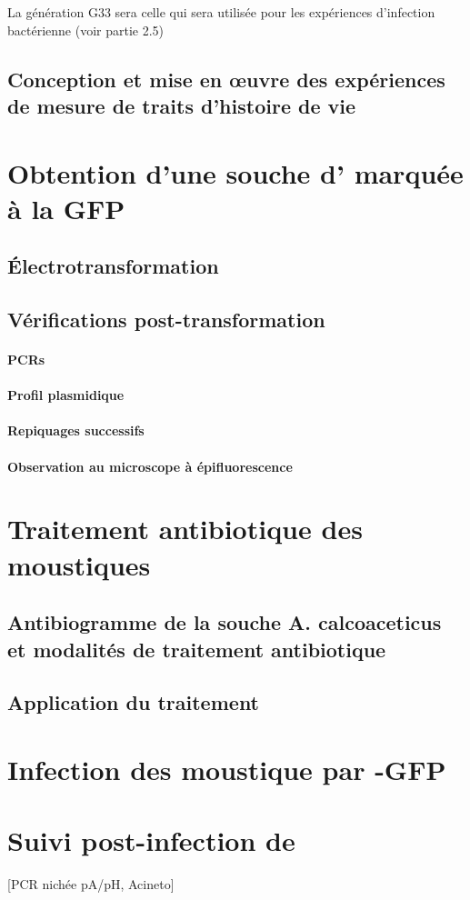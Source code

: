 La génération G33 sera celle qui sera utilisée pour les expériences d'infection bactérienne (voir partie 2.5)

\subsection{Conception et mise en \oe{}uvre des expériences de mesure de traits d'histoire de vie}

\section{Obtention d'une souche d' marquée à la GFP}

\subsection{Électrotransformation}

\subsection{Vérifications post-transformation}

\paragraph{PCRs}
\paragraph{Profil plasmidique}
\paragraph{Repiquages successifs}
\paragraph{Observation au microscope à épifluorescence}

\section{Traitement antibiotique des moustiques}

\subsection{Antibiogramme de la souche A. calcoaceticus et modalités de traitement antibiotique}

\subsection{Application du traitement}

\section{Infection des moustique par -GFP}

\section{Suivi post-infection de }

[PCR nichée pA/pH, Acineto]